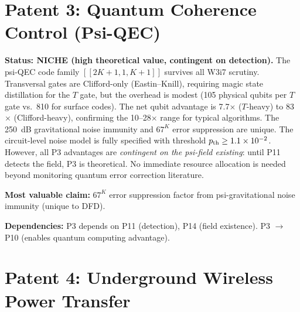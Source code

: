 \documentclass[11pt]{article}
\newcommand{\ee}[1]{\times 10^{#1}}
\begin{document}
\section{Patent 3: Quantum Coherence Control (Psi-QEC)}
\label{sec:P3}

\begin{tcolorbox}[colback=green!5!white, colframe=green!40!black,
  title=\textbf{P3: NICHE --- Resource Allocation: 2/5}]
\textbf{Status: NICHE (high theoretical value, contingent on detection).}
The psi-QEC code family $[[2K{+}1,1,K{+}1]]$ survives all W3i7 scrutiny.
Transversal gates are Clifford-only (Eastin--Knill), requiring magic
state distillation for the $T$ gate, but the overhead is modest (105
physical qubits per $T$ gate vs.\ 810 for surface codes). The net
qubit advantage is 7.7$\times$ ($T$-heavy) to 83$\times$
(Clifford-heavy), confirming the 10--28$\times$ range for typical
algorithms. The 250~dB gravitational noise immunity and $67^K$
error suppression are unique. The circuit-level noise model is fully
specified with threshold $p_{\rm th} \geq 1.1\ee{-2}$. However, all
P3 advantages are \emph{contingent on the psi-field existing}: until
P11 detects the field, P3 is theoretical. No immediate resource
allocation is needed beyond monitoring quantum error correction
literature.

\textbf{Most valuable claim:} $67^K$ error suppression factor from
psi-gravitational noise immunity (unique to DFD).

\textbf{Dependencies:} P3 depends on P11 (detection), P14 (field
existence). P3 $\to$ P10 (enables quantum computing advantage).
\end{tcolorbox}

\section{Patent 4: Underground Wireless Power Transfer}
\label{sec:P4}
\end{document}

